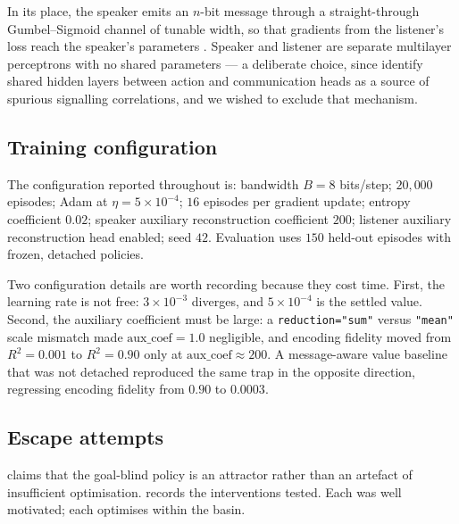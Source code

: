 \documentclass[11pt,a4paper]{article}
\theoremstyle{plain}
\theoremstyle{definition}
\theoremstyle{remark}
\newcommand{\code}[1]{\texttt{\small #1}}
\begin{document}
\begin{appendices}
In its place, the speaker emits an $n$-bit message through a straight-through Gumbel--Sigmoid channel
\citep{jang2016categorical} of tunable width, so that gradients from the listener's loss reach the speaker's
parameters \citep{foerster2016learning}. Speaker and listener are separate multilayer perceptrons with no shared
parameters --- a deliberate choice, since \citet{lowe2019pitfalls} identify shared hidden layers between action
and communication heads as a source of spurious signalling correlations, and we wished to exclude that
mechanism.

\subsection{Training configuration}

The configuration reported throughout is: bandwidth $B = 8$ bits/step; $20{,}000$ episodes; Adam at
$\eta = 5\times10^{-4}$; $16$ episodes per gradient update; entropy coefficient $0.02$; speaker auxiliary
reconstruction coefficient $200$; listener auxiliary reconstruction head enabled; seed $42$. Evaluation uses
$150$ held-out episodes with frozen, detached policies.

Two configuration details are worth recording because they cost time. First, the learning rate is not free:
$3\times10^{-3}$ diverges, and $5\times10^{-4}$ is the settled value. Second, the auxiliary coefficient must be
large: a \code{reduction="sum"} versus \code{"mean"} scale mismatch made $\mathrm{aux\_coef} = 1.0$ negligible,
and encoding fidelity moved from $R^2 = 0.001$ to $R^2 = 0.90$ only at $\mathrm{aux\_coef} \approx 200$. A
message-aware value baseline that was not detached reproduced the same trap in the opposite direction,
regressing encoding fidelity from $0.90$ to $0.0003$.

\subsection{Escape attempts}

 claims that the goal-blind policy is an attractor rather than an artefact of insufficient
optimisation.  records the interventions tested. Each was well motivated; each optimises
within the basin.


\end{appendices}
\end{document}

